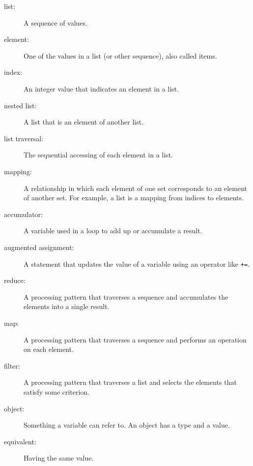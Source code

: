 \documentclass[10pt]{book}
\begin{document}
\begin{description}

\item[list:] A sequence of values.

\item[element:] One of the values in a list (or other sequence),
also called items.

\item[index:] An integer value that indicates an element in a list.

\item[nested list:] A list that is an element of another list.

\item[list traversal:] The sequential accessing of each element in a list.

\item[mapping:] A relationship in which each element of one set
corresponds to an element of another set.  For example, a list is
a mapping from indices to elements.

\item[accumulator:] A variable used in a loop to add up or
accumulate a result.

\item[augmented assignment:] A statement that updates the value
of a variable using an operator like \verb"+=".

\item[reduce:] A processing pattern that traverses a sequence
and accumulates the elements into a single result.

\item[map:] A processing pattern that traverses a sequence and
performs an operation on each element.

\item[filter:] A processing pattern that traverses a list and
selects the elements that satisfy some criterion.

\item[object:] Something a variable can refer to.  An object
has a type and a value.

\item[equivalent:] Having the same value.


\end{description}
\end{document}

